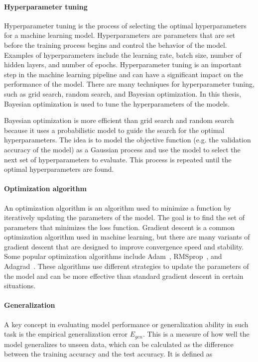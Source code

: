 \paragraph{Hyperparameter tuning}
Hyperparameter tuning is the process of selecting the optimal hyperparameters for a machine learning model. Hyperparameters are parameters that are set before the training process begins and control the behavior of the model. Examples of hyperparameters include the learning rate, batch size, number of hidden layers, and number of epochs. Hyperparameter tuning is an important step in the machine learning pipeline and can have a significant impact on the performance of the model. There are many techniques for hyperparameter tuning, such as grid search, random search, and Bayesian optimization. In this thesis, Bayesian optimization is used to tune the hyperparameters of the models.

Bayesian optimization is more efficient than grid search and random search because it uses a probabilistic model to guide the search for the optimal hyperparameters. The idea is to model the objective function (e.g. the validation accuracy of the model) as a Gaussian process and use the model to select the next set of hyperparameters to evaluate. This process is repeated until the optimal hyperparameters are found.

\paragraph{Optimization algorithm}
An optimization algorithm is an algorithm used to minimize a function by iteratively updating the parameters of the model. The goal is to find the set of parameters that minimizes the loss function. Gradient descent is a common optimization algorithm used in machine learning, but there are many variants of gradient descent that are designed to improve convergence speed and stability. Some popular optimization algorithms include Adam~\cite{kingma2014adam}, RMSprop~\cite{graves2013generating}, and Adagrad~\cite{duchi2011adaptive}. These algorithms use different strategies to update the parameters of the model and can be more effective than standard gradient descent in certain situations. 

\paragraph{Generalization}
A key concept in evaluating model performance or generalization ability in such task is the empirical generalization error $E_{gen}$. This is a measure of how well the model generalizes to unseen data, which can be calculated as the difference between the training accuracy and the test accuracy. It is defined as

